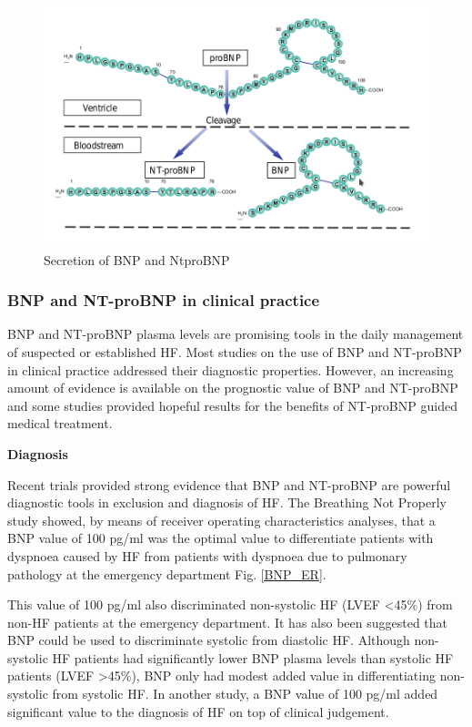 \documentclass[14pt,a4paper,onecolumn]{extarticle}
\begin{document}
\begin{figure}
    \centering
    \includegraphics[scale=0.4]{./images/BNP_secretion.png}
    \caption{Secretion of BNP and NtproBNP}
    \label{BNP_secretion}
\end{figure}

\subsubsection{BNP and NT-proBNP in clinical practice}
BNP and NT-proBNP plasma levels are promising tools in the daily management of suspected or established HF. Most studies on the use of BNP and NT-proBNP in clinical practice addressed their diagnostic properties. However, an increasing amount of evidence is available on the prognostic value of BNP and NT-proBNP and some studies provided hopeful results for the benefits of NT-proBNP guided medical treatment.

\textbf{Diagnosis}

Recent trials provided strong evidence that BNP and NT-proBNP are powerful diagnostic tools in exclusion and diagnosis of HF. The Breathing Not Properly study showed, by means of receiver operating characteristics analyses, that a BNP value of 100 pg/ml was the optimal value to differentiate patients with dyspnoea caused by HF from patients with dyspnoea due to pulmonary pathology at the emergency department Fig. \ref{BNP_ER}. \citep{Maisel2002}

This value of 100 pg/ml also discriminated non-systolic HF (LVEF <45\%) from non-HF patients at the emergency department. It has also been suggested that BNP could be used to discriminate systolic from diastolic HF. Although non-systolic HF patients had significantly lower BNP plasma levels than systolic HF patients (LVEF >45\%), BNP only had modest added value in differentiating non-systolic from systolic HF. In another study, a BNP value of 100 pg/ml added significant value to the diagnosis of HF on top of clinical judgement. \citep{McCullough2002}
\end{document}
